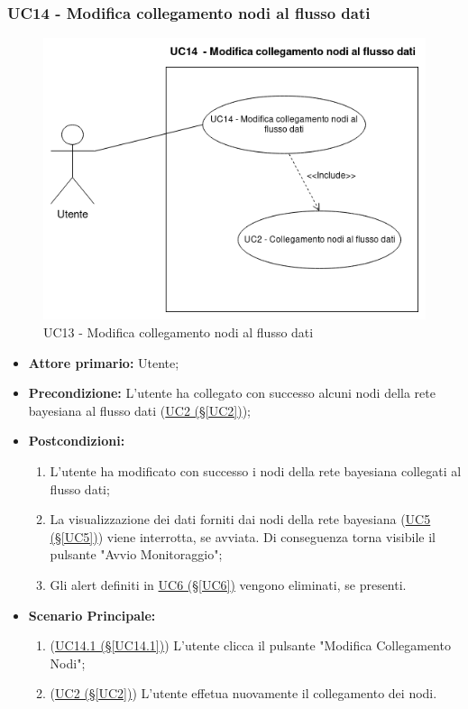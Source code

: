 \pagebreak

\subsubsection{UC14 - Modifica collegamento nodi al flusso dati}\label{UC14}

\begin{figure}[H]
\centering
\includegraphics[scale=0.6]{./images/UC14.png}
\caption{UC13 - Modifica collegamento nodi al flusso dati}
\end{figure}


\begin{itemize}
\item \textbf{Attore primario:} Utente;
\item \textbf{Precondizione:} L'utente ha collegato con successo alcuni nodi della rete bayesiana al flusso dati 			(\hyperref[UC2]{UC2 (§\ref*{UC2})});
\item \textbf{Postcondizioni:} 
	\begin{enumerate}
	\item L'utente ha modificato con successo i nodi della rete bayesiana collegati al flusso dati;
	\item La visualizzazione dei dati forniti dai nodi della rete bayesiana (\hyperref[UC5]{UC5 (§\ref*{UC5})}) viene 		interrotta, se avviata. Di conseguenza torna visibile il pulsante "Avvio Monitoraggio";
	\item Gli alert definiti in \hyperref[UC6]{UC6 (§\ref*{UC6})} vengono eliminati, se presenti.
	\end{enumerate}
\item \textbf{Scenario Principale:}
	\begin{enumerate}
	\item (\hyperref[UC14.1]{UC14.1 (§\ref*{UC14.1})}) L'utente clicca il pulsante "Modifica Collegamento Nodi";
	\item (\hyperref[UC2]{UC2 (§\ref*{UC2})}) L'utente effetua nuovamente il collegamento dei nodi.
	\end{enumerate}
\end{itemize}

